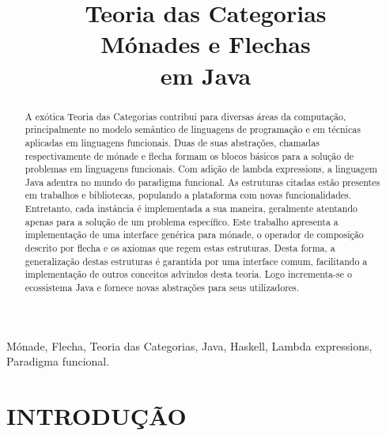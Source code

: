 \documentclass[10pt, conference]{IEEEtran}
\begin{document}

\title { 
	Teoria das Categorias \\
	Mónades e Flechas \\
	em Java 
}

\author{

}
					  
\maketitle

\begin{abstract}
A exótica Teoria das Categorias contribui para diversas áreas da computação, principalmente no modelo semântico de linguagens de programação e em técnicas aplicadas em linguagens funcionais. Duas de suas abstrações, chamadas respectivamente de mónade e flecha formam os blocos básicos para a solução de problemas em linguagens funcionais. Com adição de lambda expressions, a linguagem Java adentra no mundo do paradigma funcional. As estruturas citadas estão presentes em trabalhos e bibliotecas, populando a plataforma com novas funcionalidades. Entretanto, cada instância é implementada a sua maneira, geralmente atentando apenas para a solução de um problema específico. Este trabalho apresenta a implementação de uma interface genérica para mónade, o operador de composição descrito por flecha e os axiomas que regem estas estruturas. Desta forma, a generalização destas estruturas é garantida por uma interface comum, facilitando a implementação de outros conceitos advindos desta teoria. Logo incrementa-se o ecossistema Java e fornece novas abstrações para seus utilizadores.\\
\end{abstract}

\begin{IEEEkeywords}
Mónade, Flecha, Teoria das Categorias, Java, Haskell, Lambda expressions, Paradigma funcional.
\end{IEEEkeywords}

\section{INTRODUÇÃO}
\label{sec:intro}
\end{document}
